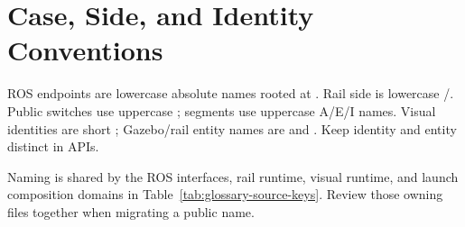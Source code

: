 \section{Case, Side, and Identity Conventions}

ROS endpoints are lowercase absolute names rooted at .
Rail side is lowercase /. Public switches use uppercase
; segments use uppercase A/E/I names. Visual identities are short
; Gazebo/rail entity names are
 and
. Keep identity and entity distinct in APIs.

Naming is shared by the ROS interfaces, rail runtime, visual runtime, and launch
composition domains in Table~\ref{tab:glossary-source-keys}. Review those
owning files together when migrating a public name.
